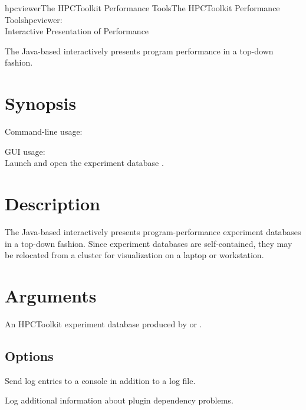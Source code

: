\documentclass[english]{article}
\begin{document}
\begin{Name}{1}{hpcviewer}{The HPCToolkit Performance Tools}{The HPCToolkit Performance Tools}{hpcviewer:\\ Interactive Presentation of Performance}

The Java-based  interactively presents program performance in a top-down fashion.

\end{Name}

\section{Synopsis}

Command-line usage:\\
\SP\SP\SP{}  

GUI usage:\\
\SP\SP\SP Launch  and open the experiment database .


\section{Description}

The Java-based  interactively presents program-performance experiment databases
in a top-down fashion.
Since experiment databases are self-contained,
they may be relocated from a cluster for visualization on a laptop or workstation.

\section{Arguments}

\begin{Description}
\item[\Arg{hpctoolkit-database}] An HPCToolkit experiment database
produced by  or .
\end{Description}


\subsection{Options}

\begin{Description}

\item[\Opt{-consolelog}]
Send log entries to a console in addition to a log file.

\item[\Opt{-debug}]
Log additional information about plugin dependency problems.

\end{Description}
\end{document}
